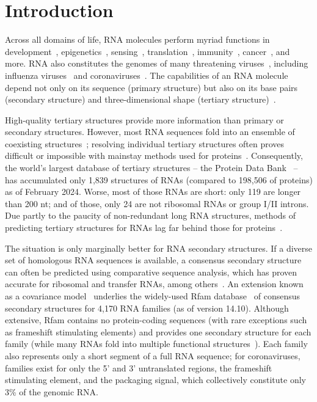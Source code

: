 \documentclass[main.tex]{subfiles}
\begin{document}
\section{Introduction}

Across all domains of life, RNA molecules perform myriad functions in development~\cite{Klattenhoff2013}, epigenetics~\cite{Bhan2015}, sensing~\cite{Kortmann2012,Serganov2013}, translation~\cite{Noller2012}, immunity~\cite{Wiedenheft2012}, cancer~\cite{Hajjari2015}, and more.
RNA also constitutes the genomes of many threatening viruses~\cite{Woolhouse2018}, including influenza viruses~\cite{Bouvier2008} and coronaviruses~\cite{Yang2015a}.
The capabilities of an RNA molecule depend not only on its sequence (primary structure) but also on its base pairs (secondary structure) and three-dimensional shape (tertiary structure)~\cite{Mortimer2014}.

High-quality tertiary structures provide more information than primary or secondary structures.
However, most RNA sequences fold into an ensemble of coexisting structures~\cite{Mustoe2014,Spitale2023}; resolving individual tertiary structures often proves difficult or impossible with mainstay methods used for proteins~\cite{Kappel2020}.
Consequently, the world's largest database of tertiary structures -- the Protein Data Bank~\cite{Berman2000} -- has accumulated only 1,839 structures of RNAs (compared to 198,506 of proteins) as of February 2024.
Worse, most of those RNAs are short: only 119 are longer than 200 nt; and of those, only 24 are not ribosomal RNAs or group I/II introns.
Due partly to the paucity of non-redundant long RNA structures, methods of predicting tertiary structures for RNAs lag far behind those for proteins~\cite{Schneider2023}.

The situation is only marginally better for RNA secondary structures.
If a diverse set of homologous RNA sequences is available, a consensus secondary structure can often be predicted using comparative sequence analysis, which has proven accurate for ribosomal and transfer RNAs, among others~\cite{Cannone2002}.
An extension known as a covariance model~\cite{Eddy1994} underlies the widely-used Rfam database~\cite{Kalvari2020} of consensus secondary structures for 4,170 RNA families (as of version 14.10).
Although extensive, Rfam contains no protein-coding sequences (with rare exceptions such as frameshift stimulating elements) and provides one secondary structure for each family (while many RNAs fold into multiple functional structures~\cite{Spitale2023}).
Each family also represents only a short segment of a full RNA sequence; for coronaviruses, families exist for only the 5' and 3' untranslated regions, the frameshift stimulating element, and the packaging signal, which collectively constitute only 3\% of the genomic RNA.
\end{document}
